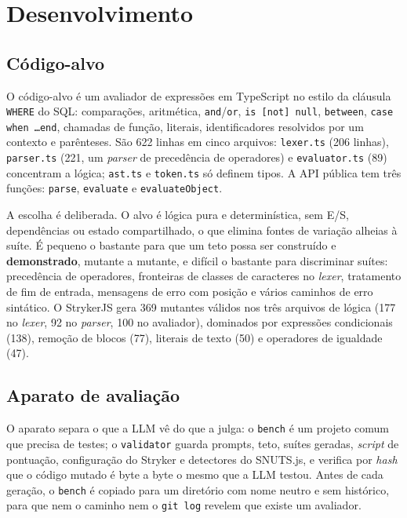 \chapter{Desenvolvimento}
\label{cap:desenvolvimento}

\section{Código-alvo}
\label{sec:alvo}

O código-alvo é um avaliador de expressões em TypeScript no estilo da cláusula \texttt{WHERE} do SQL: comparações, aritmética, \texttt{and}/\texttt{or}, \texttt{is [not] null}, \texttt{between}, \texttt{case when \ldots end}, chamadas de função, literais, identificadores resolvidos por um contexto e parênteses. São 622 linhas em cinco arquivos: \texttt{lexer.ts} (206 linhas), \texttt{parser.ts} (221, um \textit{parser} de precedência de operadores) e \texttt{evaluator.ts} (89) concentram a lógica; \texttt{ast.ts} e \texttt{token.ts} só definem tipos. A API pública tem três funções: \texttt{parse}, \texttt{evaluate} e \texttt{evaluateObject}.

A escolha é deliberada. O alvo é lógica pura e determinística, sem E/S, dependências ou estado compartilhado, o que elimina fontes de variação alheias à suíte. É pequeno o bastante para que um teto possa ser construído e \textbf{demonstrado}, mutante a mutante, e difícil o bastante para discriminar suítes: precedência de operadores, fronteiras de classes de caracteres no \textit{lexer}, tratamento de fim de entrada, mensagens de erro com posição e vários caminhos de erro sintático. O StrykerJS gera 369 mutantes válidos nos três arquivos de lógica (177 no \textit{lexer}, 92 no \textit{parser}, 100 no avaliador), dominados por expressões condicionais (138), remoção de blocos (77), literais de texto (50) e operadores de igualdade (47).

\section{Aparato de avaliação}
\label{sec:aparato}

O aparato separa o que a LLM vê do que a julga: o \texttt{bench} é um projeto comum que precisa de testes; o \texttt{validator} guarda prompts, teto, suítes geradas, \textit{script} de pontuação, configuração do Stryker e detectores do SNUTS.js, e verifica por \textit{hash} que o código mutado é byte a byte o mesmo que a LLM testou. Antes de cada geração, o \texttt{bench} é copiado para um diretório com nome neutro e sem histórico, para que nem o caminho nem o \texttt{git log} revelem que existe um avaliador.

